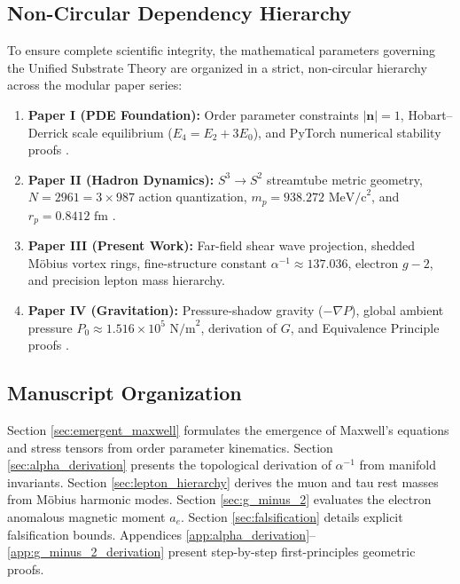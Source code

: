 \documentclass[11pt,a4paper]{article}
\begin{document}
	\subsection{Non-Circular Dependency Hierarchy}
	To ensure complete scientific integrity, the mathematical parameters governing the Unified Substrate Theory are organized in a strict, non-circular hierarchy across the modular paper series:
	\begin{enumerate}
		\item \textbf{Paper I (PDE Foundation):} Order parameter constraints $|\mathbf{n}|=1$, Hobart--Derrick scale equilibrium ($E_4 = E_2 + 3E_0$), and PyTorch numerical stability proofs \cite{PaperI}.
		\item \textbf{Paper II (Hadron Dynamics):} $S^3 \to S^2$ streamtube metric geometry, $N = 2961 = 3 \times 987$ action quantization, $m_p = 938.272 \text{ MeV/c}^2$, and $r_p = 0.8412 \text{ fm}$ \cite{PaperII}.
		\item \textbf{Paper III (Present Work):} Far-field shear wave projection, shedded Möbius vortex rings, fine-structure constant $\alpha^{-1} \approx 137.036$, electron $g-2$, and precision lepton mass hierarchy.
		\item \textbf{Paper IV (Gravitation):} Pressure-shadow gravity ($-\nabla P$), global ambient pressure $P_0 \approx 1.516 \times 10^5 \text{ N/m}^2$, derivation of $G$, and Equivalence Principle proofs \cite{PaperIV}.
	\end{enumerate}
	
	\subsection{Manuscript Organization}
	Section \ref{sec:emergent_maxwell} formulates the emergence of Maxwell's equations and stress tensors from order parameter kinematics. Section \ref{sec:alpha_derivation} presents the topological derivation of $\alpha^{-1}$ from manifold invariants. Section \ref{sec:lepton_hierarchy} derives the muon and tau rest masses from Möbius harmonic modes. Section \ref{sec:g_minus_2} evaluates the electron anomalous magnetic moment $a_e$. Section \ref{sec:falsification} details explicit falsification bounds. Appendices \ref{app:alpha_derivation}--\ref{app:g_minus_2_derivation} present step-by-step first-principles geometric proofs.
	
\end{document}
